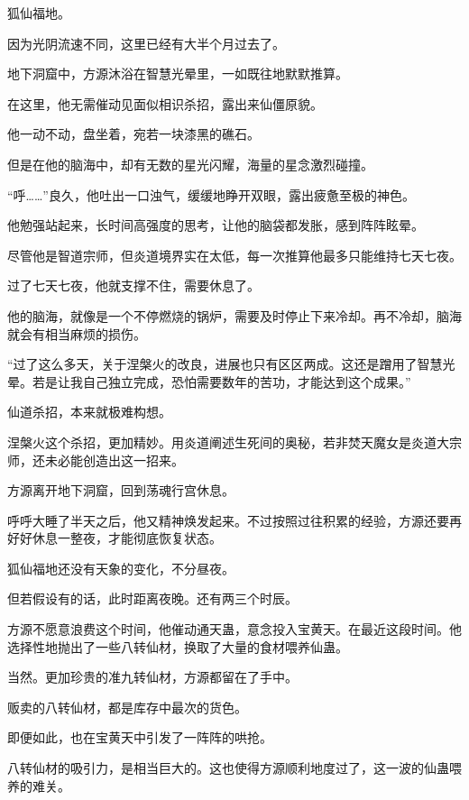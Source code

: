 
\begin{this_body}

狐仙福地。

因为光阴流速不同，这里已经有大半个月过去了。

地下洞窟中，方源沐浴在智慧光晕里，一如既往地默默推算。

在这里，他无需催动见面似相识杀招，露出来仙僵原貌。

他一动不动，盘坐着，宛若一块漆黑的礁石。

但是在他的脑海中，却有无数的星光闪耀，海量的星念激烈碰撞。

“呼……”良久，他吐出一口浊气，缓缓地睁开双眼，露出疲惫至极的神色。

他勉强站起来，长时间高强度的思考，让他的脑袋都发胀，感到阵阵眩晕。

尽管他是智道宗师，但炎道境界实在太低，每一次推算他最多只能维持七天七夜。

过了七天七夜，他就支撑不住，需要休息了。

他的脑海，就像是一个不停燃烧的锅炉，需要及时停止下来冷却。再不冷却，脑海就会有相当麻烦的损伤。

“过了这么多天，关于涅槃火的改良，进展也只有区区两成。这还是蹭用了智慧光晕。若是让我自己独立完成，恐怕需要数年的苦功，才能达到这个成果。”

仙道杀招，本来就极难构想。

涅槃火这个杀招，更加精妙。用炎道阐述生死间的奥秘，若非焚天魔女是炎道大宗师，还未必能创造出这一招来。

方源离开地下洞窟，回到荡魂行宫休息。

呼呼大睡了半天之后，他又精神焕发起来。不过按照过往积累的经验，方源还要再好好休息一整夜，才能彻底恢复状态。

狐仙福地还没有天象的变化，不分昼夜。

但若假设有的话，此时距离夜晚。还有两三个时辰。

方源不愿意浪费这个时间，他催动通天蛊，意念投入宝黄天。在最近这段时间。他选择性地抛出了一些八转仙材，换取了大量的食材喂养仙蛊。

当然。更加珍贵的准九转仙材，方源都留在了手中。

贩卖的八转仙材，都是库存中最次的货色。

即便如此，也在宝黄天中引发了一阵阵的哄抢。

八转仙材的吸引力，是相当巨大的。这也使得方源顺利地度过了，这一波的仙蛊喂养的难关。


\end{this_body}
